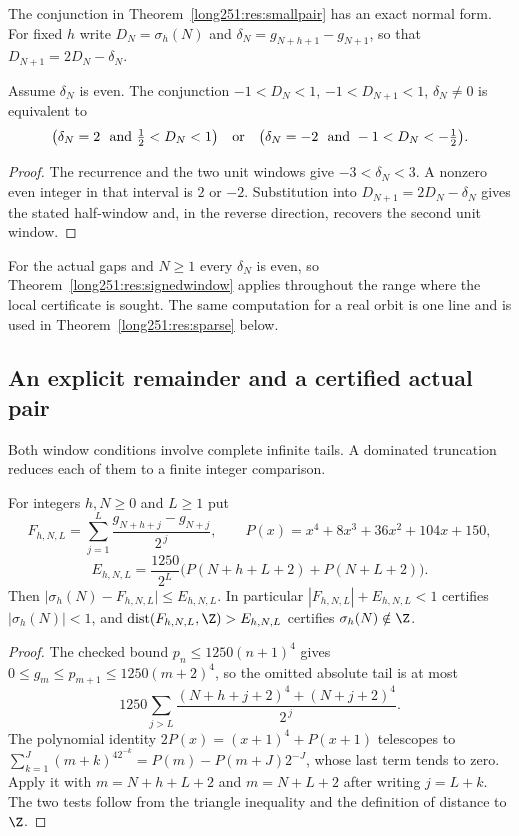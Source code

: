 \documentclass[11pt]{article}
\begin{document}
The conjunction in Theorem~\ref{long251:res:smallpair} has an exact normal form.  For
fixed $h$ write $D_N=\sigma_h(N)$ and $\delta_N=g_{N+h+1}-g_{N+1}$, so that
$D_{N+1}=2D_N-\delta_N$.

\begin{theorem}\label{long251:res:signedwindow}
Assume $\delta_N$ is even.  The conjunction
$-1<D_N<1$, $-1<D_{N+1}<1$, $\delta_N\ne0$ is equivalent to
\[
 \bigl(\delta_N=2\ \hbox{ and }\tfrac12<D_N<1\bigr)
 \quad\hbox{or}\quad
 \bigl(\delta_N=-2\ \hbox{ and }-1<D_N<-\tfrac12\bigr).
\]
\end{theorem}

\begin{proof}
The recurrence and the two unit windows give $-3<\delta_N<3$.  A nonzero even
integer in that interval is $2$ or $-2$.  Substitution into
$D_{N+1}=2D_N-\delta_N$ gives the stated half-window and, in the reverse
direction, recovers the second unit window.
\end{proof}

For the actual gaps and $N\ge1$ every $\delta_N$ is even, so
Theorem~\ref{long251:res:signedwindow} applies throughout the range where the local
certificate is sought.  The same computation for a real orbit is one line and
is used in Theorem~\ref{long251:res:sparse} below.

\subsection{An explicit remainder and a certified actual pair}

Both window conditions involve complete infinite tails.  A dominated
truncation reduces each of them to a finite integer comparison.

\begin{proposition}\label{long251:res:explicit-remainder}
For integers $h,N\ge0$ and $L\ge1$ put
\[
 F_{h,N,L}=\sum_{j=1}^{L}\frac{g_{N+h+j}-g_{N+j}}{2^{\,j}},\qquad
 P(x)=x^4+8x^3+36x^2+104x+150,
\]
\[
 E_{h,N,L}=\frac{1250}{2^{L}}\bigl(P(N+h+L+2)+P(N+L+2)\bigr).
\]
Then $\bigl|\sigma_h(N)-F_{h,N,L}\bigr|\le E_{h,N,L}$.  In particular
$|F_{h,N,L}|+E_{h,N,L}<1$ certifies $|\sigma_h(N)|<1$, and
$\operatorname{dist}(F_{h,N,L},\Z)>E_{h,N,L}$ certifies
$\sigma_h(N)\notin\Z$.
\end{proposition}

\begin{proof}
The checked bound $p_n\le1250(n+1)^4$ gives $0\le g_m\le p_{m+1}\le1250(m+2)^4$,
so the omitted absolute tail is at most
\[
 1250\sum_{j>L}\frac{(N+h+j+2)^4+(N+j+2)^4}{2^{\,j}} .
\]
The polynomial identity $2P(x)=(x+1)^4+P(x+1)$ telescopes to
$\sum_{k=1}^{J}(m+k)^42^{-k}=P(m)-P(m+J)2^{-J}$, whose last term tends to zero.
Apply it with $m=N+h+L+2$ and $m=N+L+2$ after writing $j=L+k$.  The two tests
follow from the triangle inequality and the definition of distance to $\Z$.
\end{proof}
\end{document}

